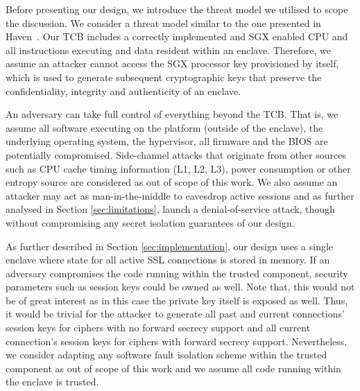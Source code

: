 \documentclass[../main.tex]{subfiles}
\begin{document}
Before presenting our design, we introduce the threat model we
utilised to scope the discussion. We consider a threat model similar
to the one presented in Haven~\cite{Baumann14}. Our TCB includes a
correctly implemented and SGX enabled CPU and all instructions
executing and data resident within an enclave. Therefore, we assume an
attacker cannot access the SGX processor key provisioned by \Intel
itself, which is used to generate subsequent cryptographic keys that
preserve the confidentiality, integrity and authenticity of an
enclave.

An adversary can take full control of everything beyond the TCB. That
is, we assume all software executing on the platform (outside of the
enclave), the underlying operating system, the hypervisor, all
firmware and the BIOS are potentially compromised. Side-channel
attacks that originate from other sources such as CPU cache timing
information (L1, L2, L3), power consumption or other entropy source
are considered as out of scope of this work. We also assume an
attacker may act as man-in-the-middle to eavesdrop active sessions
and as further analysed in Section \ref{sec:limitations}, launch
a denial-of-service attack, though without compromising any secret
isolation guarantees of our design.

As further described in Section \ref{sec:implementation}, our design
uses a single enclave where state for all active SSL connections is
stored in memory. If an adversary compromises the code running within
the trusted component, security parameters such as session keys could
be owned as well. Note that, this would not be of great interest as
in this case the private key itself is exposed as well. Thus, it
would be trivial for the attacker to generate all past and current
connections' session keys for ciphers with no forward secrecy support
and all current connection's session keys for ciphers with forward
secrecy support. Nevertheless, we consider adapting any software
fault isolation scheme within the trusted component as out of scope
of this work and we assume all code running within the enclave is
trusted.
\end{document}
